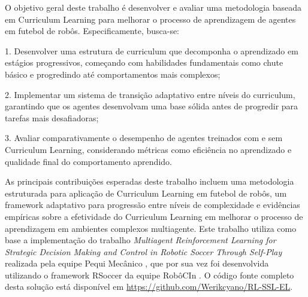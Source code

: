 O objetivo geral deste trabalho é desenvolver e avaliar uma metodologia baseada em Curriculum Learning para melhorar o processo de aprendizagem de agentes em futebol de robôs. Especificamente, busca-se:

1. Desenvolver uma estrutura de curriculum que decomponha o aprendizado em estágios progressivos, começando com habilidades fundamentais como chute básico e progredindo até comportamentos mais complexos;

2. Implementar um sistema de transição adaptativo entre níveis do curriculum, garantindo que os agentes desenvolvam uma base sólida antes de progredir para tarefas mais desafiadoras;

3. Avaliar comparativamente o desempenho de agentes treinados com e sem Curriculum Learning, considerando métricas como eficiência no aprendizado e qualidade final do comportamento aprendido.

As principais contribuições esperadas deste trabalho incluem uma metodologia estruturada para aplicação de Curriculum Learning em futebol de robôs, um framework adaptativo para progressão entre níveis de complexidade e evidências empíricas sobre a efetividade do Curriculum Learning em melhorar o processo de aprendizagem em ambientes complexos multiagente. Este trabalho utiliza como base a implementação \cite{framework_pequi_rSoccer} do trabalho \textit{Multiagent Reinforcement Learning for Strategic Decision Making and Control in Robotic Soccer Through Self-Play} \cite{bruno_brandao} realizada pela equipe Pequi Mecânico \cite{pequi_mecanico}, que por sua vez foi desenvolvida utilizando o framework RSoccer \cite{rSoccer} da equipe RobôCIn \cite{robocin}. O código fonte completo desta solução está disponível em \url{https://github.com/Werikcyano/RL-SSL-EL}.
